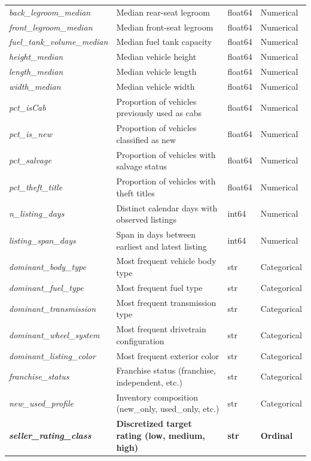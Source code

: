 \documentclass[11pt,a4paper]{article}
\numberwithin{table}{section}
\numberwithin{figure}{section}
\begin{document}
\begin{table}[H]
\begin{tabularx}{\textwidth}{l X l l}
    \emph{back\_legroom\_median} & Median rear-seat legroom & float64 & Numerical \\
    \emph{front\_legroom\_median} & Median front-seat legroom & float64 & Numerical \\
    \emph{fuel\_tank\_volume\_median} & Median fuel tank capacity & float64 & Numerical \\
    \emph{height\_median} & Median vehicle height & float64 & Numerical \\
    \emph{length\_median} & Median vehicle length & float64 & Numerical \\
    \emph{width\_median} & Median vehicle width & float64 & Numerical \\
    \emph{pct\_isCab} & Proportion of vehicles previously used as cabs & float64 & Numerical \\
    \emph{pct\_is\_new} & Proportion of vehicles classified as new & float64 & Numerical \\
    \emph{pct\_salvage} & Proportion of vehicles with salvage status & float64 & Numerical \\
    \emph{pct\_theft\_title} & Proportion of vehicles with theft titles & float64 & Numerical \\
    \emph{n\_listing\_days} & Distinct calendar days with observed listings & int64 & Numerical \\
    \emph{listing\_span\_days} & Span in days between earliest and latest listing & int64 & Numerical \\
    \emph{dominant\_body\_type} & Most frequent vehicle body type & str & Categorical \\
    \emph{dominant\_fuel\_type} & Most frequent fuel type & str & Categorical \\
    \emph{dominant\_transmission} & Most frequent transmission type & str & Categorical \\
    \emph{dominant\_wheel\_system} & Most frequent drivetrain configuration & str & Categorical \\
    \emph{dominant\_listing\_color} & Most frequent exterior color & str & Categorical \\
    \emph{franchise\_status} & Franchise status (franchise, independent, etc.) & str & Categorical \\
    \emph{new\_used\_profile} & Inventory composition (new\_only, used\_only, etc.) & str & Categorical \\
    \textbf{\emph{seller\_rating\_class}} & \textbf{Discretized target rating (low, medium, high)} & \textbf{str} & \textbf{Ordinal} \\
    \bottomrule
  \end{tabularx}
\end{table}
\end{document}
